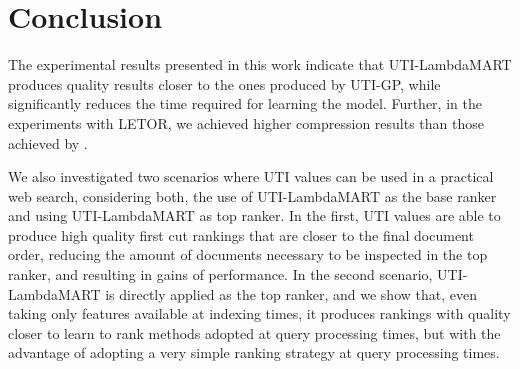 \documentclass[preprint,review,10pt,3p]{elsarticle}
\begin{document}


















\section{Conclusion}

The experimental results presented in this work indicate that
UTI-LambdaMART produces quality results closer to the ones produced by
UTI-GP, while significantly reduces the time required for learning the
model. Further, in the experiments with LETOR, we achieved higher
compression results than those achieved by \cite{costa2012lepref}.


We also investigated two scenarios where UTI values can be used in a
practical web search, considering both, the use of UTI-LambdaMART as
the base ranker and using UTI-LambdaMART as top ranker. In the first,
UTI values are able to produce high quality first cut rankings that
are closer to the final document order, reducing the amount of
documents necessary to be inspected in the top ranker, and resulting
in gains of performance. In the second scenario, UTI-LambdaMART is
directly applied as the top ranker, and we show that, even taking only
features available at indexing times, it produces rankings with
quality closer to learn to rank methods adopted at query processing
times, but with the advantage of adopting a very simple ranking
strategy at query processing times.
\end{document}
